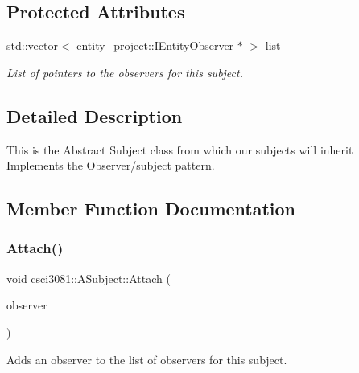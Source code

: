 \subsection*{Protected Attributes}
\begin{DoxyCompactItemize}
\item 
\mbox{\label{classcsci3081_1_1ASubject_a3babfe8bff88a50ce4ce30973f2c5003}} 
std\+::vector$<$ \hyperlink{classentity__project_1_1IEntityObserver}{entity\+\_\+project\+::\+I\+Entity\+Observer} $\ast$ $>$ \hyperlink{classcsci3081_1_1ASubject_a3babfe8bff88a50ce4ce30973f2c5003}{list}
\begin{DoxyCompactList}\small\item\em List of pointers to the observers for this subject. \end{DoxyCompactList}\end{DoxyCompactItemize}


\subsection{Detailed Description}
This is the Abstract Subject class from which our subjects will inherit Implements the Observer/subject pattern. 

\subsection{Member Function Documentation}
\mbox{\label{classcsci3081_1_1ASubject_a8a04b98cb169de561a8a861baf82c8c3}} 
\subsubsection{\texorpdfstring{Attach()}{Attach()}}
{\footnotesize\ttfamily void csci3081\+::\+A\+Subject\+::\+Attach (\begin{DoxyParamCaption}\item[{\hyperlink{classentity__project_1_1IEntityObserver}{entity\+\_\+project\+::\+I\+Entity\+Observer} $\ast$}]{observer }\end{DoxyParamCaption})}



Adds an observer to the list of observers for this subject. 


